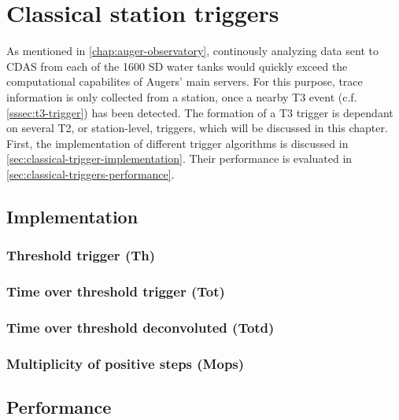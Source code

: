 
\chapter{Classical station triggers}
\label{chap:classical-triggers}

As mentioned in \autoref{chap:auger-observatory}, continously analyzing data sent to CDAS from each of the 1600 SD water tanks would quickly exceed the 
computational capabilites of Augers' main servers. For this purpose, trace information is only collected from a station, once a nearby T3 event 
(c.f. \autoref{sssec:t3-trigger}) has been detected. The formation of a T3 trigger is dependant on several T2, or station-level, triggers, which will
be discussed in this chapter. First, the implementation of different trigger algorithms is discussed in \autoref{sec:classical-trigger-implementation}.
Their performance is evaluated in \autoref{sec:classical-triggers-performance}.

\section{Implementation}
\label{sec:classical-triggers-implementation}

\subsection{Threshold trigger (Th)}
\label{ssec:threshold-trigger}

\subsection{Time over threshold trigger (Tot)}
\label{ssec:time-over-threshold-trigger}

\subsection{Time over threshold deconvoluted (Totd)}
\label{ssec:time-over-threshold-deconvoluted}

\subsection{Multiplicity of positive steps (Mops)}
\label{ssec:multiplicity-of-positive-steps}



\section{Performance}
\label{sec:classical-triggers-performance}




